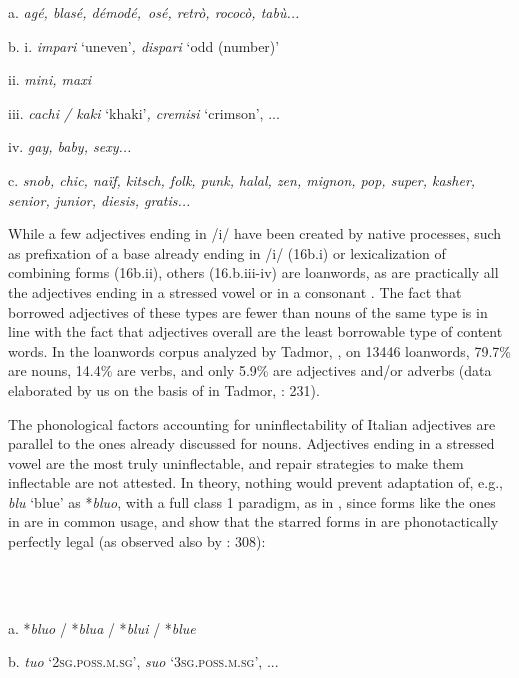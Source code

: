 \documentclass[output=paper]{langscibook}
\begin{document}
          a.  \textit{agé, blasé, démodé,~osé, retrò, rococò, tabù...}

  b.  i.  \textit{impari} ‘uneven’\textit{, dispari} ‘odd (number)’

ii. \textit{mini, maxi} 

iii. \textit{cachi / kaki} ‘khaki’\textit{, cremisi} ‘crimson’, ...

iv. \textit{gay, baby, sexy...}

c.  \textit{snob, chic, naïf, kitsch, folk, punk, halal, zen, mignon, pop, super, kasher, senior, junior, diesis, gratis...}

While a few adjectives ending in /i/ have been created by native processes, such as prefixation of a base already ending in /i/ (16b.i) or lexicalization of combining forms (16b.ii), others (16.b.iii-iv) are loanwords, as are practically all the adjectives ending in a stressed vowel  or in a consonant . The fact that borrowed adjectives of these types are fewer than nouns of the same type is in line with the fact that adjectives overall are the least borrowable type of content words. In the loanwords corpus analyzed by Tadmor, \citet{HaspelmathTaylor2010}, on 13446 loanwords, 79.7\% are nouns, 14.4\% are verbs, and only 5.9\% are adjectives and/or adverbs (data elaborated by us on the basis of  in Tadmor, \citealt{HaspelmathTaylor2010}: 231).

The phonological factors accounting for uninflectability of Italian adjectives are parallel to the ones already discussed for nouns. Adjectives ending in a stressed vowel are the most truly uninflectable, and repair strategies to make them inflectable are not attested. In theory, nothing would prevent adaptation of, e.g., \textit{blu} ‘blue’ as *\textit{bluo}, with a full class 1 paradigm, as in , since forms like the ones in  are in common usage, and show that the starred forms in  are phonotactically perfectly legal (as observed also by \citealt{Fedden2019}: 308):

\ea%
    \label{ex:key:17}
    \gll \\
         \\
    \glt
    \z %

          a.  *\textit{bluo} / *\textit{blua} / *\textit{blui} / *\textit{blue}

  b.  \textit{tuo} ‘\textsc{2sg.poss.m.sg’}, \textit{suo} ‘\textsc{3sg.poss.m.sg’,} ... 
\end{document}
